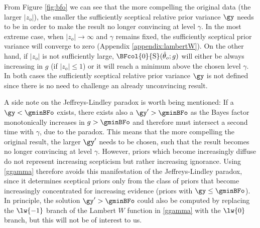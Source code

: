 From Figure \ref{fig:bfo} we can see that the more compelling the original data
(\ie the larger $|z_o|$), the smaller the sufficiently sceptical relative prior
variance $\gy$ needs to be in order to make the result no longer convincing at
level $\gamma$. In the most extreme case, when $|z_{o}| \to \infty$ and $\gamma$
remains fixed, the sufficiently sceptical prior variance will converge to
zero (Appendix \ref{appendix:lambertW}). On the other hand, if $|z_o|$ is not
sufficiently large, $\BFcol{0}{\mathrm{S}}(\hat{\theta}_o; g)$ will either be
always increasing in $g$ (if $|z_o| \leq 1$) or it will reach a minimum above
the chosen level $\gamma$. In both cases the sufficiently sceptical relative
prior variance $\gy$ is not defined since there is no need to challenge an
already unconvincing result.

A side note on the Jeffreys-Lindley paradox is worth being mentioned: If a
$\gy < \gminBFo$ exists, there exists also a $\gy^\prime > \gminBFo$ as the
Bayes factor monotonically increases in $g > \gminBFo$ and therefore must
intersect a second time with $\gamma$, due to the paradox. This means that the
more compelling the original result, the larger $\gy^\prime$ needs to be chosen,
such that the result becomes no longer convincing at level $\gamma$. However,
priors which become increasingly diffuse do not represent increasing scepticism
but rather increasing ignorance. Using \eqref{ggamma} therefore avoids this
manifestation of the Jeffreys-Lindley paradox, since it determines sceptical
priors only from the class of priors that become increasingly concentrated for
increasing evidence (\ie priors with $\gy \leq \gminBFo$). In principle, the
solution $\gy^\prime > \gminBFo $ could also be computed by replacing the
$\lw{-1}$ branch of the Lambert $W$ function in \eqref{ggamma} with the $\lw{0}$
branch, but this will not be of interest to us.



